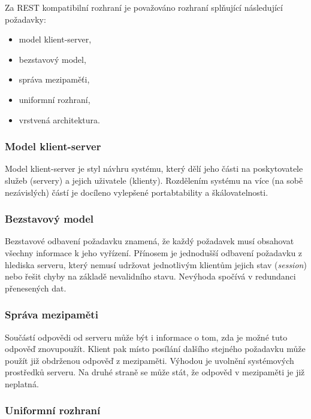 Za REST kompatibilní rozhraní je považováno rozhraní splňující následující požadavky:

\begin{itemize}
	\item model klient-server,
	\item bezstavový model,
	\item správa mezipaměťi,
	\item uniformní rozhraní,
	\item vrstvená architektura. \cite{rest}
\end{itemize}

\subsubsection{Model klient-server}

Model klient-server je styl návhru systému, který dělí jeho části na poskytovatele služeb (servery) a jejich uživatele (klienty).
Rozdělením systému na více (na sobě nezávislých) částí je docíleno vylepšené portabtability a škálovatelnosti.
\cite{rest_klient_server}

\subsubsection{Bezstavový model}

Bezstavové odbavení požadavku znamená, že každý požadavek musí obsahovat všechny informace k jeho vyřízení.
Přínosem je jednodušší odbavení požadavku z hlediska serveru, který nemusí udržovat jednotlivým klientům jejich stav (\textit{session}) nebo řešit chyby na základě nevalidního stavu.
Nevýhoda spočívá v redundanci přenesených dat.
\cite{rest_bezstavovy}

\subsubsection{Správa mezipaměti}

Součástí odpovědi od serveru může být i informace o tom, zda je možné tuto odpověď znovupoužít.
Klient pak místo posílání dalšího stejného požadavku může použít již obdrženou odpověď z mezipaměti.
Výhodou je uvolnění systémových prostředků serveru.
Na druhé straně se může stát, že odpověd v mezipaměti je již neplatná.
\cite{rest_mezipamet}

\subsubsection{Uniformní rozhraní}

